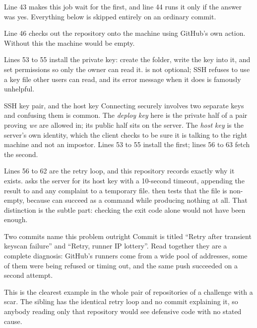 Line 43 makes this job wait for the first, and line 44 runs it only if the answer was
yes. Everything below is skipped entirely on an ordinary commit.

Line 46 checks out the repository onto the machine using GitHub's own action.
Without this the machine would be empty.

Lines 53 to 55 install the private key: create the  folder, write the key
into it, and set permissions so only the owner can read it.  is not
optional; SSH refuses to use a key file other users can read, and its error message
when it does is famously unhelpful.

\begin{jargon}{SSH key pair, and the host key}
Connecting securely involves two separate keys and confusing them is common. The
\emph{deploy key} here is the private half of a pair proving \emph{we} are allowed
in; its public half sits on the server. The \emph{host key} is the server's own
identity, which the client checks to be sure it is talking to the right machine and
not an impostor. Lines 53 to 55 install the first; lines 56 to 63 fetch the second.
\end{jargon}

Lines 56 to 62 are the retry loop, and this repository records exactly why it exists.
 asks the server for its host key with a 10-second timeout,
appending the result to  and any complaint to a temporary file.
 then tests that the file is non-empty, because
 can succeed as a command while producing nothing at all. That
distinction is the subtle part: checking the exit code alone would not have been
enough.

\begin{keyidea}{Two commits name this problem outright}
Commit  is titled ``Retry after transient keyscan failure'' and
 ``Retry, runner IP lottery''. Read together they are a complete
diagnosis: GitHub's runners come from a wide pool of addresses, some of them were
being refused or timing out, and the same push succeeded on a second attempt.

This is the clearest example in the whole pair of repositories of a challenge with a
scar. The sibling has the identical retry loop and no commit explaining it, so
anybody reading only that repository would see defensive code with no stated cause.
\end{keyidea}

